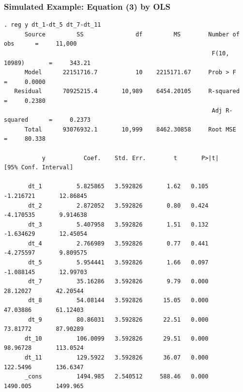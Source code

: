 \documentclass[11pt,aspectratio=169]{beamer}
\begin{document}
\begin{frame}[fragile]
  \frametitle{Simulated Example: Equation (3) by OLS}
{\tiny
\begin{verbatim}
. reg y dt_1-dt_5 dt_7-dt_11
      Source         SS               df         MS        Number of obs      =     11,000
                                                            F(10, 10989)       =     343.21
      Model      22151716.7           10    2215171.67     Prob > F           =     0.0000
   Residual      70925215.4       10,989    6454.20105     R-squared          =     0.2380
                                                            Adj R-squared      =     0.2373
      Total      93076932.1       10,999    8462.30858     Root MSE           =     80.338

           y           Coef.    Std. Err.        t       P>|t|       [95% Conf. Interval]

       dt_1          5.825865   3.592826       1.62   0.105         -1.216721       12.86845
       dt_2          2.872052   3.592826       0.80   0.424         -4.170535       9.914638
       dt_3          5.407958   3.592826       1.51   0.132         -1.634629       12.45054
       dt_4          2.766989   3.592826       0.77   0.441         -4.275597       9.809575
       dt_5          5.954441   3.592826       1.66   0.097         -1.088145       12.99703
       dt_7          35.16286   3.592826       9.79   0.000          28.12027       42.20544
       dt_8          54.08144   3.592826      15.05   0.000          47.03886       61.12403
       dt_9          80.86031   3.592826      22.51   0.000          73.81772       87.90289
      dt_10          106.0099   3.592826      29.51   0.000          98.96728       113.0524
      dt_11          129.5922   3.592826      36.07   0.000          122.5496       136.6347
      _cons          1494.985   2.540512     588.46   0.000          1490.005       1499.965
\end{verbatim}
}
\end{frame}
\end{document}
